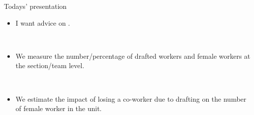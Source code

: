 \begin{frame}{Todays' presentation}
    \begin{itemize}
        \item I want advice on .

        \
        
        \item We measure the number/percentage of drafted workers and female workers at the section/team level.

        \

        \item We estimate the impact of losing a co-worker due to drafting on the number of female worker in the unit.

    \end{itemize}
\end{frame}